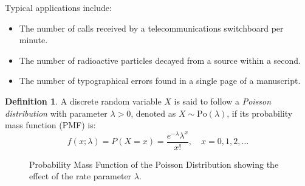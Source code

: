 \documentclass[12pt,a4paper]{report}
\theoremstyle{definition}
\newtheorem{definition}[thm]{Definition}
\theoremstyle{plain}
\theoremstyle{definition}
\begin{document}
Typical applications include:\begin{itemize}
\item The number of calls received by a telecommunications switchboard per minute.
\item The number of radioactive particles decayed from a source within a second.
\item The number of typographical errors found in a single page of a manuscript.
\end{itemize}



\begin{definition}
A discrete random variable $X$ is said to follow a \textit{Poisson distribution} with parameter $\lambda > 0$, denoted as $X \sim \text{Po}(\lambda)$, if its probability mass function (PMF) is:\[ f(x; \lambda) = P(X=x) = \frac{e^{-\lambda} \lambda^x}{x!}, \quad x = 0, 1, 2, \dots \]
\end{definition}



\begin{figure}[H]
    \centering
    \caption{Probability Mass Function of the Poisson Distribution showing the effect of the rate parameter $\lambda$.}
\end{figure}
\end{document}
